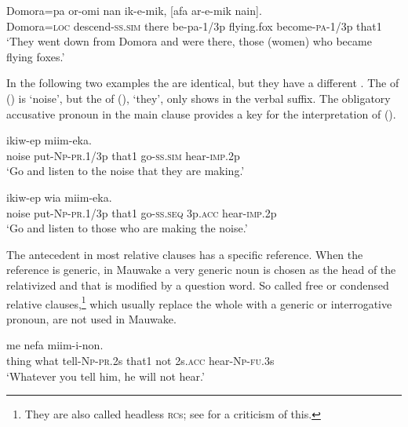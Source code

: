 \ea%
\label{ex:x1556}
\gll Domora=pa  or-omi  nan  ik-e-mik,  [afa ar-e-mik  nain]. \\
Domora=\textsc{loc} descend-\textsc{ss}.\textsc{sim} there be-pa-1/3p  flying.fox become-\textsc{pa}-1/3p  that1\\
\glt`They went down from Domora and were there, those (women) who became flying foxes.'
\z


In the following two examples the  are identical, but they have a different . The  of () is  `noise', but the  of (),  `they', only shows in the verbal suffix. The obligatory accusative pronoun in the main clause provides a key for the interpretation of ().

\ea%
\label{ex:x1557}
  ikiw-ep  miim-eka. \\
noise  put-\textsc{Np}-\textsc{pr}.1/3p that1 go-\textsc{ss}.\textsc{sim} hear-\textsc{imp}.2p\\
\glt`Go and listen to the noise that they are making.'
\z


\ea%
\label{ex:x1558}
  ikiw-ep  wia  miim-eka.\\
noise  put-\textsc{Np}-\textsc{pr}.1/3p that1 go-\textsc{ss}.\textsc{seq} 3p.\textsc{acc} hear-\textsc{imp}.2p\\
\glt`Go and listen to those who are making the noise.'
\z


The antecedent in most relative clauses has a specific reference. When the reference is generic, in Mauwake a very generic noun is chosen as the head of the relativized  and that is modified by a question word. So called free \citep[213]{Andrews2007b} or condensed \citep[359]{Dixon2010b} relative clauses,\footnote{They are also called headless \textsc{rc}s; see \citet[317,360]{Dixon2010b} for a criticism of this.} which usually replace the whole  with a generic or interrogative pronoun, are not used in Mauwake. 

\ea%
\label{ex:x1562}
  me  nefa  miim-i-non.\\
thing  what  tell-\textsc{Np}-\textsc{pr}.2s that1 not 2s.\textsc{acc} hear-\textsc{Np}-\textsc{fu}.3s\\
\glt`Whatever you tell him, he will not hear.'
\z



